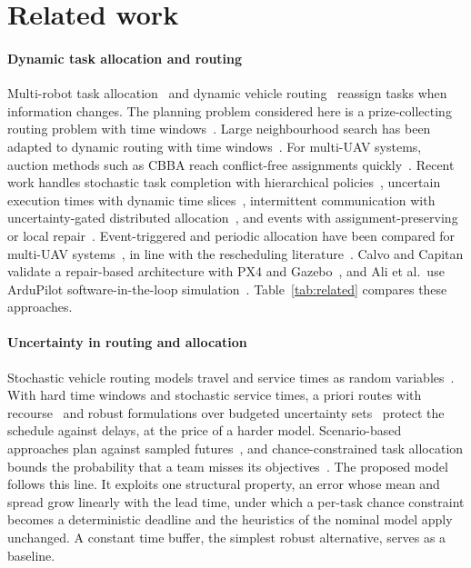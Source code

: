 \section{Related work}\label{sec:related}
\paragraph{Dynamic task allocation and routing} Multi-robot task allocation~\cite{gerkey2004formal} and dynamic vehicle
routing~\cite{pillac2013review,psaraftis2016dynamic} reassign tasks when information changes. The
planning problem considered here is a prize-collecting routing problem with time
windows~\cite{solomon1987algorithms,vansteenwegen2011orienteering}. Large neighbourhood search has been adapted to dynamic routing with time windows~\cite{alnsdvrp2024}. For multi-UAV
systems, auction methods such as CBBA reach conflict-free assignments quickly~\cite{choi2009consensus}.
Recent work handles stochastic task completion with hierarchical policies~\cite{choudhury2022dynamic}, uncertain
execution times with dynamic time slices~\cite{huang2024dynamic}, intermittent communication with uncertainty-gated
distributed allocation~\cite{ucdg2026drones}, and events with assignment-preserving or local
repair~\cite{hwang2026apr,shen2026localrepair}. Event-triggered and periodic allocation have been compared for
multi-UAV systems~\cite{cong2026event}, in line with the rescheduling
literature~\cite{vieira2003rescheduling,ouelhadj2009survey}. Calvo and Capitan validate a repair-based architecture
with PX4 and Gazebo~\cite{calvo2025heterogeneous}, and Ali et al.\ use ArduPilot software-in-the-loop
simulation~\cite{ali2026sitl}. Table~\ref{tab:related} compares these approaches.


\paragraph{Uncertainty in routing and allocation} Stochastic vehicle routing models travel and service times as random
variables~\cite{gendreau1996stochastic}. With hard time windows and stochastic service times, a priori routes with
recourse~\cite{errico2016apriori} and robust formulations over budgeted uncertainty
sets~\cite{agra2013robust} protect the schedule against delays, at the price of a harder model. Scenario-based
approaches plan against sampled futures~\cite{bent2004scenario}, and chance-constrained task allocation bounds the
probability that a team misses its objectives~\cite{ponda2012chance}. The proposed model follows this line. It exploits
one structural property, an error whose mean and spread grow linearly with the lead time, under which a per-task chance
constraint becomes a deterministic deadline and the heuristics of the nominal model apply unchanged. A constant time
buffer, the simplest robust alternative, serves as a baseline.

